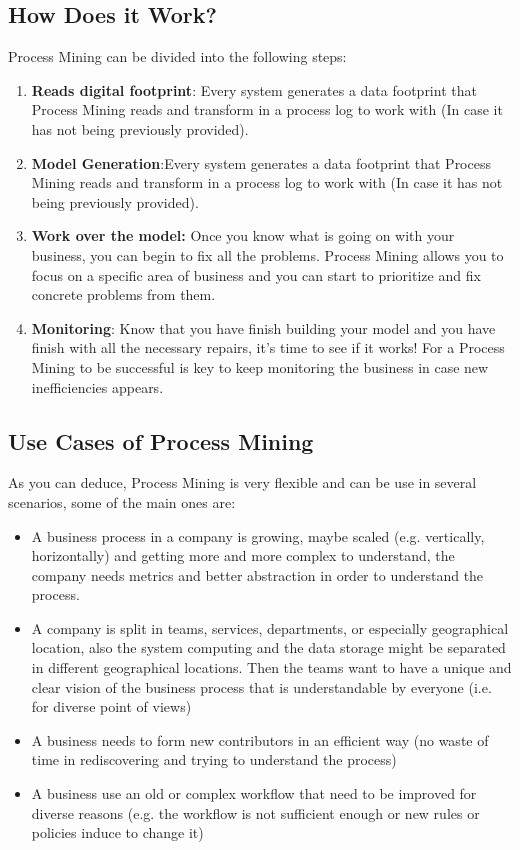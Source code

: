 \documentclass[conference]{IEEEtran}
\begin{document}
\subsection{How Does it Work?}

Process Mining can be divided into the following steps:

\begin{enumerate}
    \item \textbf{Reads digital footprint}: Every system generates a data footprint that Process Mining reads and transform in a process log to work with (In case it has not being previously provided).
    \item \textbf{Model Generation}:Every system generates a data footprint that Process Mining reads and transform in a process log to work with (In case it has not being previously provided).
    \item \textbf{Work over the model:} Once you know what is going on with your business, you can begin to fix all the problems. Process Mining allows you to focus on a specific area of business and you can start to prioritize and fix concrete problems from them.
    \item \textbf{Monitoring}: Know that you have finish building your model and you have finish with all the necessary repairs, it’s time to see if it works! For a Process Mining to be successful is key to keep monitoring the business in case new inefficiencies appears.
\end{enumerate}

\subsection{Use Cases of Process Mining}
As you can deduce, Process Mining is very flexible and can be use in several scenarios, some of the main ones are:
\begin{itemize}
    \item A business process in a company is growing, maybe scaled (e.g. vertically, horizontally) and getting more and more complex to understand, the company needs metrics and better abstraction in order to understand the process.
    \item A company is split in teams, services, departments, or especially geographical location, also the system computing and the data storage might be separated in different geographical locations. Then the teams want to have a unique and clear vision of the business process that is understandable by everyone (i.e. for diverse point of views)
    \item A business needs to form new contributors in an efficient way (no waste of time in rediscovering and trying to understand the process)
    \item A business use an old or complex workflow that need to be improved for diverse reasons (e.g. the workflow is not sufficient enough or new rules or policies induce to change it) 
\end{itemize}
\end{document}
